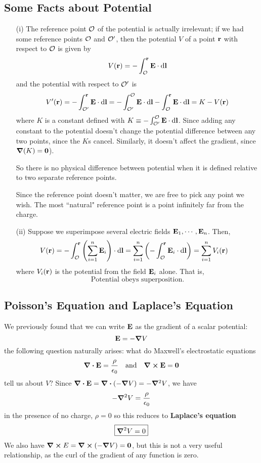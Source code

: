 \subsection*{Some Facts about Potential}
\begin{enumerate}
    \item[(i)] The reference point $\mathcal{O}$ of the potential is actually irrelevant; if we had some reference points $\mathcal{O}$ and $\mathcal{O}'$, then the potential $V$ of a point $\mathbf{r}$ with respect to $\mathcal{O}$ is given by
    \[ V(\mathbf{r}) = -\int_{\mathcal{O}}^{\mathbf{r}} \mathbf{E} \cdot \dd \mathbf{l}\]
    and the potential with respect to $\mathcal{O}'$ is 
    \[ V'(\mathbf{r}) = -\int_{\mathcal{O}'}^{\mathbf{r}} \mathbf{E} \cdot \dd \mathbf{l} = -\int_{\mathcal{O}'}^{\mathcal{O}} \mathbf{E} \cdot \dd \mathbf{l} - \int_{\mathcal{O}}^{\mathbf{r}}\mathbf{E} \cdot \dd \mathbf{l} = K - V(\mathbf{r})\]
    where $K$ is a constant defined with $K\equiv -\int_{\mathcal{O}'}^{\mathcal{O}} \mathbf{E} \cdot \dd \mathbf{l}$. Since adding any constant to the potential doesn't change the potential difference between any two points, since the $K$s cancel. Similarly, it doesn't affect the gradient, since $\grad(K)=\mathbf{0}$). 

    So there is no physical difference between potential when it is defined relative to two separate reference points.

    Since the reference point doesn't matter, we are free to pick any point we wish. The most ``natural" reference point is a point infinitely far from the charge. 
    \item[(ii)] Suppose we superimpose several electric fields $\mathbf{E}_1, \cdots, \mathbf{E}_n$. Then,
    \begin{align*}
        V(\b r) &= -\int_{\mcl O}^{\b r} \pqty{\sum_{i=1}^n \b E_i}\cdot \dd \b l = \sum_{i=1}^n \pqty{-\int_{\mcl O}^{\b r} \b E_i\cdot \dd \b l}  = \sum_{i=1}^n V_i(\b r) 
    \end{align*}
    where $V_i(\mathbf{r})$ is the potential from the field $\mathbf{E}_i$ alone. That is,
    \[ \boxed{\text{Potential obeys superposition.}} \]
\end{enumerate}
\subsection*{Poisson's Equation and Laplace's Equation}
We previously found that we can write $\mathbf{E}$ as the gradient of a scalar potential:
\[ \mathbf{E} = -\grad V\]
the following question naturally arises: what do Maxwell's electrostatic equations
\[ \div\mathbf{E} = \frac{\rho}{\epsilon_0} \quad\text{and}\quad \curl \mathbf{E} = \mathbf{0}\]
tell us about $V$? Since $\div \mathbf{E} = \div (-\grad V) = -\grad^2V$, we have
\[ -\grad^2 V = \frac{\rho}{\epsilon_0} \]
in the presence of no charge, $\rho=0$ so this reduces to \textbf{Laplace's equation}
\[ \boxed{\grad^2V = 0}\]
We also have $\curl E = \curl(-\grad V) = \mathbf{0}$, but this is not a very useful relationship, as the curl of the gradient of any function is zero.
